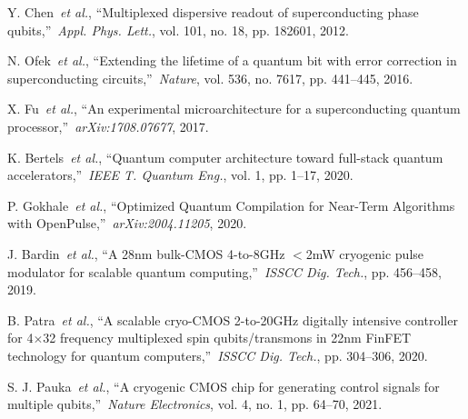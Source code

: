 \documentclass{ieeetran}
\begin{document}
\begin{thebibliography}{00}
 Y. Chen~\emph{et al.}, ``Multiplexed dispersive readout of superconducting phase qubits,''~\emph{Appl. Phys. Lett.}, vol. 101, no. 18, pp. 182601, 2012.

 N. Ofek~\emph{et al.}, ``Extending the lifetime of a quantum bit with error correction in superconducting circuits,''~\emph{Nature}, vol. 536, no. 7617, pp. 441--445, 2016.

 X. Fu~\emph{et al.}, ``An experimental microarchitecture for a superconducting quantum processor,''~\emph{arXiv:1708.07677}, 2017.

 K. Bertels~\emph{et al.}, ``Quantum computer architecture toward full-stack quantum accelerators,''~\emph{IEEE T. Quantum Eng.}, vol. 1, pp. 1--17, 2020.

 P. Gokhale~\emph{et al.}, ``Optimized Quantum Compilation for Near-Term Algorithms with OpenPulse,''~\emph{arXiv:2004.11205}, 2020.

 J. Bardin~\emph{et al.}, ``A 28nm bulk-CMOS 4-to-8GHz $<$2mW cryogenic pulse modulator for scalable quantum computing,''~\emph{ISSCC Dig. Tech.}, pp. 456--458, 2019.

 B. Patra~\emph{et al.}, ``A scalable cryo-CMOS 2-to-20GHz digitally intensive controller for 4$\times$32 frequency multiplexed spin qubits/transmons in 22nm FinFET technology for quantum computers,''~\emph{ISSCC Dig. Tech.}, pp. 304--306, 2020.

 S. J. Pauka~\emph{et al.}, ``A cryogenic CMOS chip for generating control signals for multiple qubits,''~\emph{Nature Electronics}, vol. 4, no. 1, pp. 64--70, 2021.





\end{thebibliography}
\end{document}
